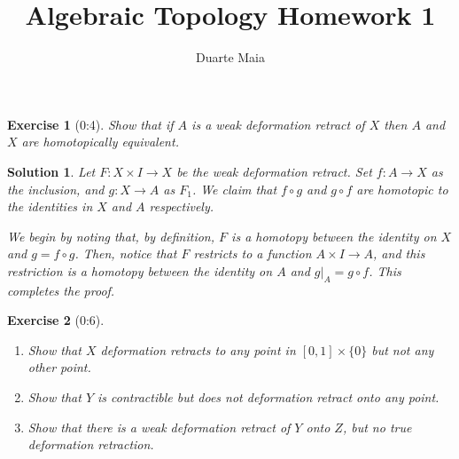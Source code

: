 \documentclass{article}
\title{Algebraic Topology Homework 1}
\author{Duarte Maia}
\theoremstyle{plain}
\newtheorem*{ex}{Exercise}
\theoremstyle{nonumberplain}
\newtheorem{sol}{Solution}
\begin{document}
\maketitle

\begin{ex}[0:4]
Show that if $A$ is a weak deformation retract of $X$ then $A$ and $X$ are homotopically equivalent.
\end{ex}

\begin{sol}
Let $F \colon X \times I \to X$ be the weak deformation retract. Set $f \colon A \to X$ as the inclusion, and $g \colon X \to A$ as $F_1$. We claim that $f \circ g$ and $g \circ f$ are homotopic to the identities in $X$ and $A$ respectively.

We begin by noting that, by definition, $F$ is a homotopy between the identity on $X$ and $g = f \circ g$. Then, notice that $F$ restricts to a function $A \times I \to A$, and this restriction is a homotopy between the identity on $A$ and $g|_A = g \circ f$. This completes the proof.
\end{sol}

\begin{ex}[0:6]
\leavevmode
\begin{enumerate}
\item Show that $X$ deformation retracts to any point in $[0,1] \times \{0\}$ but not any other point.

\item Show that $Y$ is contractible but does not deformation retract onto any point.

\item Show that there is a weak deformation retract of $Y$ onto $Z$, but no true deformation retraction.
\end{enumerate}
\end{ex}
\end{document}
